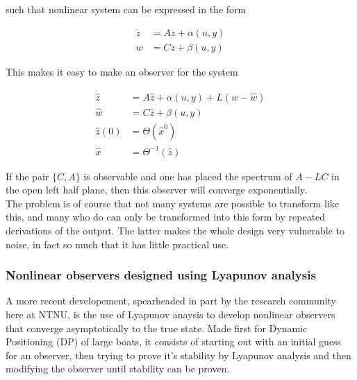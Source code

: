 such that nonlinear system can be expressed in the form

\begin{align}
    \Dot{z} &= Az + \alpha(u,y) \\
    w &= Cz + \beta(u,y)
\end{align}

This makes it easy to make an observer for the system

\begin{align}
    \Dot{\hat{z}} &= A\hat{z} + \alpha(u,y) + L(w-\hat{w}) \\
    \hat{w} &= C\hat{z} + \beta(u,y) \\
    \hat{z}(0) &= \Theta(\hat{x}^0) \\ 
    \hat{x} &= \Theta^{-1}(\hat{z})
\end{align}

If the pair $\{C,A\}$ is observable and one has placed the spectrum of $A-LC$ in the open left half plane, then this observer will converge exponentially. \\

The problem is of course that not many systems are possible to transform like this, and many who do can only be transformed into this form by repeated derivations of the output. The latter makes the whole design very vulnerable to noise, in fact so much that it has little practical use. \\

\subsubsection{Nonlinear observers designed using Lyapunov analysis}

A more recent developement, spearheaded in part by the research community here at NTNU, is the use of Lyapunov anaysis to develop nonlinear observers that converge asymptotically to the true state\cite{PassiveFossen}. Made first for Dynamic Positioning (DP) of large boats, it consists of starting out with an initial guess for an observer, then trying to prove it's stability by Lyapunov analysis and then modifying the observer until stability can be proven. \\

